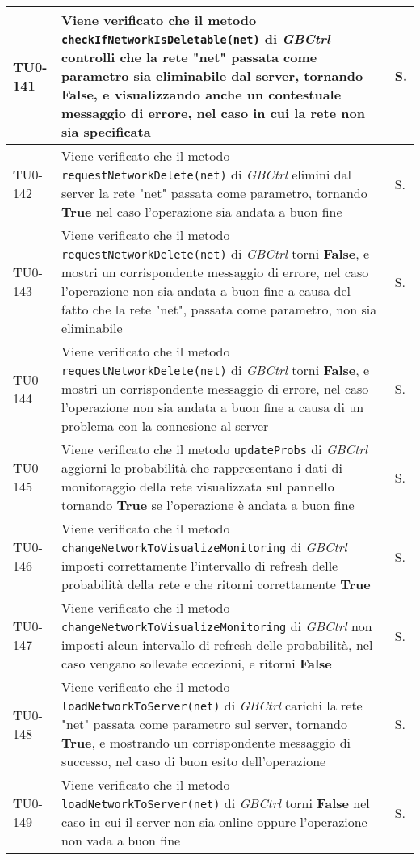 \begin{longtable}{|C{.15\textwidth}|m{.66\textwidth}|C{.10\textwidth}|}
\hline
{}TU0-141 & Viene verificato che il metodo \texttt{checkIfNetworkIsDeletable(net)} di \textit{GBCtrl} controlli che la rete "net" passata come parametro sia eliminabile dal server, tornando \textbf{False}, e visualizzando anche un contestuale messaggio di errore, nel caso in cui la rete non sia specificata & S.\\
\hline
TU0-142 & Viene verificato che il metodo \texttt{requestNetworkDelete(net)} di \textit{GBCtrl} elimini dal server la rete "net" passata come parametro, tornando \textbf{True} nel caso l'operazione sia andata a buon fine & S.\\
\hline
{}TU0-143 & Viene verificato che il metodo \texttt{requestNetworkDelete(net)} di \textit{GBCtrl} torni \textbf{False}, e mostri un corrispondente messaggio di errore, nel caso l'operazione non sia andata a buon fine a causa del fatto che la rete "net", passata come parametro, non sia eliminabile & S.\\
\hline
TU0-144 & Viene verificato che il metodo \texttt{requestNetworkDelete(net)} di \textit{GBCtrl} torni \textbf{False}, e mostri un corrispondente messaggio di errore, nel caso l'operazione non sia andata a buon fine a causa di un problema con la connesione al server & S.\\
\hline
{}TU0-145 & Viene verificato che il metodo \texttt{updateProbs} di \textit{GBCtrl} aggiorni le probabilità che rappresentano i dati di monitoraggio della rete visualizzata sul pannello tornando \textbf{True} se l'operazione è andata a buon fine & S.\\
\hline
TU0-146 & Viene verificato che il metodo \texttt{changeNetworkToVisualizeMonitoring} di \textit{GBCtrl} imposti correttamente l'intervallo di refresh delle probabilità della rete e che ritorni correttamente \textbf{True} & S.\\
\hline
{}TU0-147 & Viene verificato che il metodo \texttt{changeNetworkToVisualizeMonitoring} di \textit{GBCtrl} non imposti alcun intervallo di refresh delle probabilità, nel caso vengano sollevate eccezioni, e ritorni \textbf{False} & S.\\
\hline
TU0-148 & Viene verificato che il metodo \texttt{loadNetworkToServer(net)} di \textit{GBCtrl} carichi la rete "net" passata come parametro sul server, tornando \textbf{True}, e mostrando un corrispondente messaggio di successo, nel caso di buon esito dell'operazione & S.\\
\hline
{}TU0-149 & Viene verificato che il metodo \texttt{loadNetworkToServer(net)} di \textit{GBCtrl} torni \textbf{False} nel caso in cui il server non sia online oppure l'operazione non vada a buon fine & S.\\

\end{longtable}
